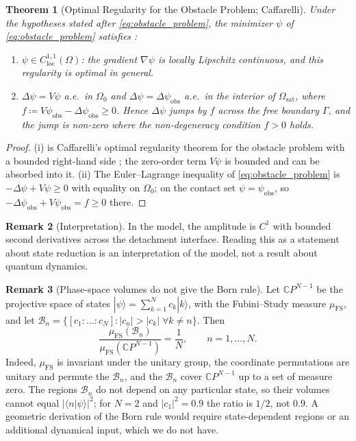 \documentclass[11pt,a4paper,reqno]{amsart}
\newtheorem{theorem}{Theorem}[section]
\theoremstyle{definition}
\newtheorem{remark}[theorem]{Remark}
\numberwithin{equation}{section}
\begin{document}
\begin{theorem}[Optimal Regularity for the Obstacle Problem; Caffarelli]
\label{thm:caffarelli_regularity}
Under the hypotheses stated after \eqref{eq:obstacle_problem}, the minimizer $\psi$ of \eqref{eq:obstacle_problem} satisfies \cite{caffarelli1998obstacle, caffarelli2005geometric}:
\begin{enumerate}[label=(\roman*)]
    \item $\psi \in C^{1,1}_{\mathrm{loc}}(\Omega)$: the gradient $\nabla \psi$ is locally Lipschitz continuous, and this regularity is optimal in general.
    \item $\Delta \psi = V\psi$ a.e.\ in $\Omega_0$ and $\Delta\psi = \Delta\psi_{\mathrm{obs}}$ a.e.\ in the interior of $\Omega_{\mathrm{sat}}$, where $f \coloneqq V\psi_{\mathrm{obs}} - \Delta\psi_{\mathrm{obs}} \ge 0$. Hence $\Delta\psi$ jumps by $f$ across the free boundary $\Gamma$, and the jump is non-zero where the non-degeneracy condition $f > 0$ holds.
\end{enumerate}
\end{theorem}
\begin{proof}
(i) is Caffarelli's optimal regularity theorem for the obstacle problem with a bounded right-hand side \cite{caffarelli1998obstacle, caffarelli2005geometric}; the zero-order term $V\psi$ is bounded and can be absorbed into it. (ii) The Euler--Lagrange inequality of \eqref{eq:obstacle_problem} is $-\Delta\psi + V\psi \ge 0$ with equality on $\Omega_0$; on the contact set $\psi = \psi_{\mathrm{obs}}$, so $-\Delta\psi_{\mathrm{obs}} + V\psi_{\mathrm{obs}} = f \ge 0$ there.
\end{proof}

\begin{remark}[Interpretation]
In the model, the amplitude is $C^1$ with bounded second derivatives across the detachment interface. Reading this as a statement about state reduction is an interpretation of the model, not a result about quantum dynamics.
\end{remark}

\begin{remark}[Phase-space volumes do not give the Born rule]
\label{prop:born_rule}
Let $\mathbb{C}P^{N-1}$ be the projective space of states $|\psi\rangle = \sum_{k=1}^N c_k |k\rangle$, with the Fubini--Study measure $\mu_{\mathrm{FS}}$, and let $\mathcal{B}_n = \{ [c_1 : \dots : c_N] \colon |c_n| > |c_k| \; \forall k \ne n \}$. Then
\begin{equation}
    \label{eq:born_ratio}
    \frac{\mu_{\mathrm{FS}}(\mathcal{B}_n)}{\mu_{\mathrm{FS}}(\mathbb{C}P^{N-1})} = \frac{1}{N}, \qquad n = 1, \dots, N.
\end{equation}
Indeed, $\mu_{\mathrm{FS}}$ is invariant under the unitary group, the coordinate permutations are unitary and permute the $\mathcal{B}_n$, and the $\mathcal{B}_n$ cover $\mathbb{C}P^{N-1}$ up to a set of measure zero. The regions $\mathcal{B}_n$ do not depend on any particular state, so their volumes cannot equal $|\langle n|\psi\rangle|^2$; for $N = 2$ and $|c_1|^2 = 0.9$ the ratio is $1/2$, not $0.9$. A geometric derivation of the Born rule would require state-dependent regions or an additional dynamical input, which we do not have.
\end{remark}
\end{document}
